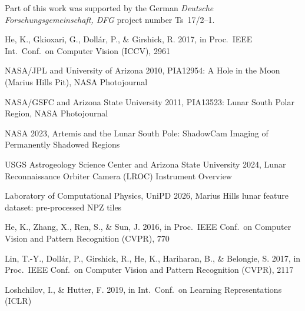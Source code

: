 \documentclass{aa}
\begin{document}
\begin{acknowledgements}
      Part of this work was supported by the German
      \emph{Deut\-sche For\-schungs\-ge\-mein\-schaft, DFG\/} project
      number Ts~17/2--1.
\end{acknowledgements}

%
%

\FloatBarrier
\begin{thebibliography}{}

    He, K., Gkioxari, G., Doll\'ar, P., \& Girshick, R. 2017,
       in Proc.\ IEEE Int.\ Conf.\ on Computer Vision (ICCV), 2961

    NASA/JPL and University of Arizona 2010,
       PIA12954: A Hole in the Moon (Marius Hills Pit), NASA Photojournal

    NASA/GSFC and Arizona State University 2011,
       PIA13523: Lunar South Polar Region, NASA Photojournal

    NASA 2023,
       Artemis and the Lunar South Pole: ShadowCam Imaging of Permanently Shadowed Regions

    USGS Astrogeology Science Center and Arizona State University 2024,
       Lunar Reconnaissance Orbiter Camera (LROC) Instrument Overview

    Laboratory of Computational Physics, UniPD 2026,
       Marius Hills lunar feature dataset: pre-processed NPZ tiles

    He, K., Zhang, X., Ren, S., \& Sun, J. 2016,
       in Proc.\ IEEE Conf.\ on Computer Vision and Pattern Recognition (CVPR), 770

    Lin, T.-Y., Doll\'ar, P., Girshick, R., He, K., Hariharan, B., \& Belongie, S. 2017,
       in Proc.\ IEEE Conf.\ on Computer Vision and Pattern Recognition (CVPR), 2117

    Loshchilov, I., \& Hutter, F. 2019,
       in Int.\ Conf.\ on Learning Representations (ICLR)


\end{thebibliography}
\end{document}
